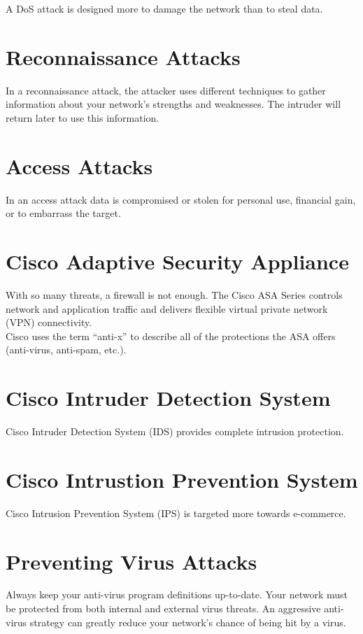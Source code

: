 \documentclass{article}
\begin{document}
A DoS attack is designed more to damage the network than to steal data.

\section{Reconnaissance Attacks}

In a reconnaissance attack, the attacker uses different techniques to gather
information about your network's strengths and weaknesses. The intruder will
return later to use this information.

\section{Access Attacks}

In an access attack data is compromised or stolen for personal use, financial
gain, or to embarrass the target.

\section{Cisco Adaptive Security Appliance}

With so many threats, a firewall is not enough. The Cisco ASA Series controls
network and application traffic and delivers flexible virtual private network
(VPN) connectivity.\\

Cisco uses the term ``anti-x'' to describe all of the protections the ASA
offers (anti-virus, anti-spam, etc.).

\section{Cisco Intruder Detection System}

Cisco Intruder Detection System (IDS) provides complete intrusion protection.

\section{Cisco Intrustion Prevention System}

Cisco Intrusion Prevention System (IPS) is targeted more towards e-commerce.

\section{Preventing Virus Attacks}

Always keep your anti-virus program definitions up-to-date. Your network
must be protected from both internal and external virus threats. An
aggressive anti-virus strategy can greatly reduce your network's chance
of being hit by a virus.\\
\end{document}
